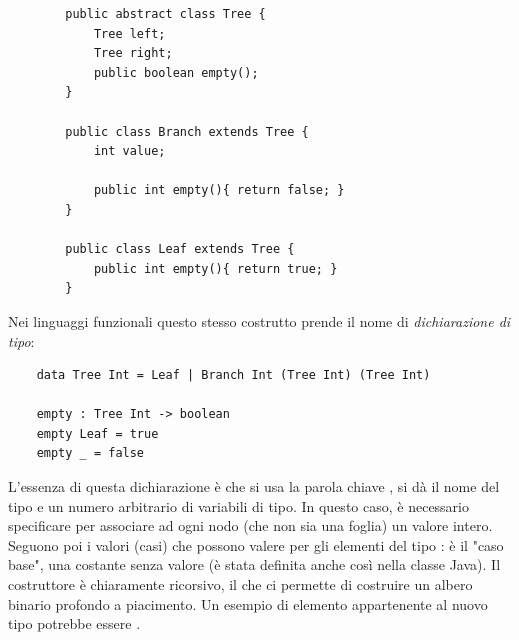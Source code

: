 \begin{verbatim}
		public abstract class Tree {
			Tree left;
			Tree right;
			public boolean empty();
		}
		
		public class Branch extends Tree {
			int value;
		
			public int empty(){ return false; }
		}
		
		public class Leaf extends Tree {	
			public int empty(){ return true; }
		}
\end{verbatim}
Nei linguaggi funzionali questo stesso costrutto prende il nome di \textit{dichiarazione di tipo}:
\begin{verbatim}
	data Tree Int = Leaf | Branch Int (Tree Int) (Tree Int)
	
	empty : Tree Int -> boolean
	empty Leaf = true
	empty _ = false
\end{verbatim}
L'essenza di questa dichiarazione è che si usa la parola chiave , si dà il nome del tipo e un numero arbitrario di variabili di tipo. In questo caso, è necessario specificare  per associare ad ogni nodo (che non sia una foglia) un valore intero. Seguono poi i valori (casi) che possono valere per gli elementi del tipo :  è il "caso base", una costante senza valore (è stata definita anche così nella classe Java). Il costruttore  è chiaramente ricorsivo, il che ci permette di costruire un albero binario profondo a piacimento. Un esempio di elemento appartenente al nuovo tipo  potrebbe essere .


